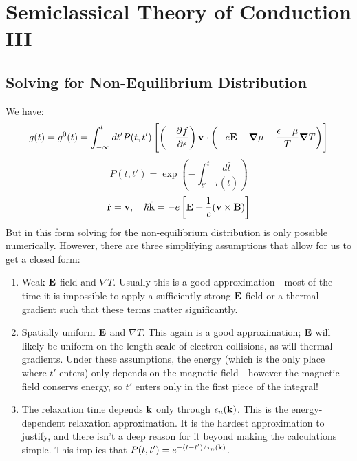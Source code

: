 \section{Semiclassical Theory of Conduction III}

\subsection{Solving for Non-Equilibrium Distribution}
We have:
\begin{equation}
    g(t) = g^0(t) = \int_{-\infty}^t dt' P(t, t')\left[\left(-\dpd{f}{\e}\right)\v{v} \cdot \left(-e\v{E} - \nabla \mu - \frac{\e - \mu}{T}\nabla T\right)\right]
\end{equation}
\begin{equation}
    P(t, t') = \exp(-\int_{t'}^t \frac{d\bar{t}}{\tau(\bar{t})})
\end{equation}
\begin{equation}
    \dot{\mathbf{r}} = \mathbf{v}, \quad \hbar \dot{\mathbf{k}} = -e\left[\mathbf{E} + \frac{1}{c}(\mathbf{v} \times \mathbf{B})\right]
\end{equation}
But in this form solving for the non-equilibrium distribution is only possible numerically. However, there are three simplifying assumptions that allow for us to get a closed form:
\begin{enumerate}
    \item Weak $\mathbf{E}$-field and $\nabla T$. Usually this is a good approximation - most of the time it is impossible to apply a sufficiently strong $\mathbf{E}$ field or a thermal gradient such that these terms matter significantly.
    \item Spatially uniform $\mathbf{E}$ and $\nabla T$. This again is a good approximation; $\mathbf{E}$ will likely be uniform on the length-scale of electron collisions, as will thermal gradients. Under these assumptions, the energy (which is the only place where $t'$ enters) only depends on the magnetic field - however the magnetic field conservs energy, so $t'$ enters only in the first piece of the integral!
    \item The relaxation time depends $\mathbf{k}$ only through $\epsilon_n(\mathbf{k})$. This is the energy-dependent relaxation approximation. It is the hardest approximation to justify, and there isn't a deep reason for it beyond making the calculations simple. This implies that $P(t, t') = e^{-(t-t')/\tau_n(\mathbf{k})}$.
\end{enumerate}

